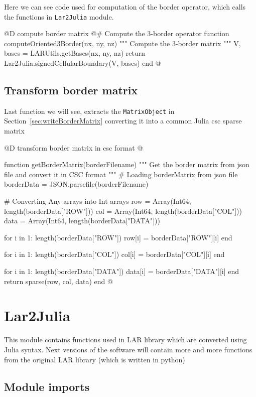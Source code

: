 \documentclass[11pt,oneside]{article}	%
\begin{document}
Here we can see code used for computation of the border operator, which calls the functions in \texttt{Lar2Julia} module.

@D compute border matrix
@{# Compute the 3-border operator
function computeOriented3Border(nx, ny, nz)
  """
  Compute the 3-border matrix
  """
  V, bases = LARUtils.getBases(nx, ny, nz)
  return Lar2Julia.signedCellularBoundary(V, bases)
end @}

\subsection{Transform border matrix}\label{sec:transformBorder}

Last function we will see, extracts the \texttt{MatrixObject} in Section~\ref{sec:writeBorderMatrix} converting it into a common Julia csc sparse matrix

@D transform border matrix in csc format
@{function getBorderMatrix(borderFilename)
  """
  Get the border matrix from json file and convert it in
  CSC format
  """
  # Loading borderMatrix from json file
  borderData = JSON.parsefile(borderFilename)
  
  # Converting Any arrays into Int arrays
  row = Array(Int64, length(borderData["ROW"]))
  col = Array(Int64, length(borderData["COL"]))
  data = Array(Int64, length(borderData["DATA"]))

  for i in 1: length(borderData["ROW"])
    row[i] = borderData["ROW"][i]
  end

  for i in 1: length(borderData["COL"])
    col[i] = borderData["COL"][i]
  end

  for i in 1: length(borderData["DATA"])
    data[i] = borderData["DATA"][i]
  end
  return sparse(row, col, data)
end @}

\section{Lar2Julia}\label{sec:Lar2Julia}
This module contains functions used in LAR library which are converted using Julia syntax. Next versions of the software will contain more and more functions from the original LAR library (which is written in python)

\subsection{Module imports}\label{sec:Lar2JuliaImports}
\end{document}
